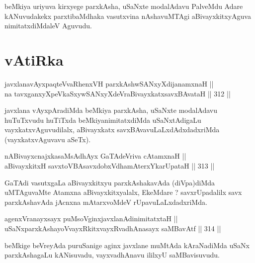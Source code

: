 \begin{artha}
beMkiya uriyuva kirxyege parxkAsha, uSaNxte modalAdavu PalveMdu Adare
kANuvudakekx parxtibaMdhaka vasutxvina nAshavuMTAgi aBivayxkitxyAguva
nimitatxdiMdaleV Aguvudu.
\end{artha}

\section*{vAtiRka}

\begin{shl}
javxlanavAyxpaqteVvaRhenxVH parxkAshwSANxyXdijanamxnaH || \\
na tavxganxyXpeVkaSxywSANxyXdeVraBivayxkatxsavxBAvataH ||  312 ||  
\end{shl}

\begin{artha}
javxlana vAyxpAradiMda beMkiya parxkAsha, uSaNxte modalAdavu
huTuTxvudu huTiTxda beMkiyanimitatxdiMda uSaNxtAdigaLu
vayxkatxvAguvudilalx, aBivayxkatx savxBAvavuLaLxdAdxdadxriMda
(vayxkatxvAguvavu aSeTx).
\end{artha}

\begin{shl}
nABivayxcnajxkasaMsAdhAyx GaTAdeVriva cA\s \s tamxnaH || \\
aBivayxkitxH savxtoVBAsavxdobxVdhamAterxYkarUpataH ||  313 ||  
\end{shl}

\begin{artha}
GaTAdi vasutxgaLa aBivayxkitxyu parxkAshakavAda (diVpa)diMda
uMTAguvaMte Atamxna aBivayxkitxyalalx, EkeMdare ? savxrUpadalilx savx
parxkAshavAda jAcnxna mAtarxvoMdeV rUpavuLaLxdadxriMda.
\end{artha}


\begin{shl}
agenxVranayxsayx puMsoV\s ginxjavxlanAdinimitatxtaH ||  \\
uSaNxparxkAshayoVvayxRkitxvayxRvadhAnasayx saMBavAtf ||  314 ||  
\end{shl}

\begin{artha}
beMkige beVreyAda puruSanige aginx javxlane muMtAda kAraNadiMda uSaNx
parxkAshagaLu kANisuvadu, vayxvadhAnavu ililxyU saMBavisuvudu.
\end{artha}

